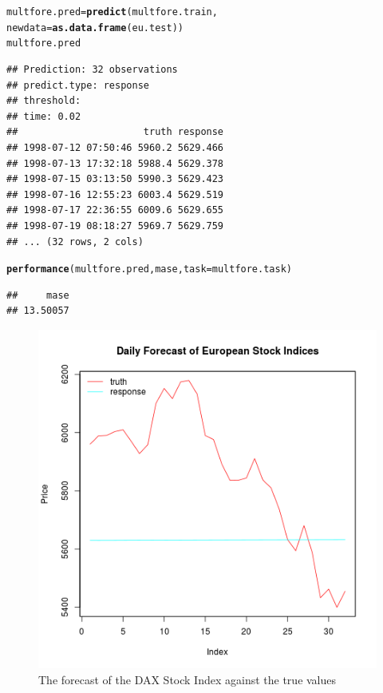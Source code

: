 \documentclass[12pt]{article}\usepackage[]{graphicx}\usepackage[]{color}
\makeatletter
\newcommand{\hlstd}[1]{\textcolor[rgb]{0.345,0.345,0.345}{#1}}%
\newcommand{\hlkwb}[1]{\textcolor[rgb]{0.69,0.353,0.396}{#1}}%
\newcommand{\hlkwc}[1]{\textcolor[rgb]{0.333,0.667,0.333}{#1}}%
\newcommand{\hlkwd}[1]{\textcolor[rgb]{0.737,0.353,0.396}{\textbf{#1}}}%
\newenvironment{kframe}{%
 \def\at@end@of@kframe{}%
 \ifinner\ifhmode%
  \def\at@end@of@kframe{\end{minipage}}%
  \begin{minipage}{\columnwidth}%
 \fi\fi%
 \def\FrameCommand##1{\hskip\@totalleftmargin \hskip-\fboxsep
 \colorbox{shadecolor}{##1}\hskip-\fboxsep
     \hskip-\linewidth \hskip-\@totalleftmargin \hskip\columnwidth}%
 \MakeFramed {\advance\hsize-\width
   \@totalleftmargin\z@ \linewidth\hsize
   \@setminipage}}%
 {\par\unskip\endMakeFramed%
 \at@end@of@kframe}
\newenvironment{knitrout}{}{} %
\theoremstyle{definition}
\makeatother
\begin{document}
\begin{knitrout}
\color{fgcolor}\begin{kframe}
\begin{alltt}
\hlstd{multfore.pred} \hlkwb{=} \hlkwd{predict}\hlstd{(multfore.train,}
                  \hlkwc{newdata} \hlstd{=} \hlkwd{as.data.frame}\hlstd{(eu.test))}
\hlstd{multfore.pred}
\end{alltt}
\begin{verbatim}
## Prediction: 32 observations
## predict.type: response
## threshold: 
## time: 0.02
##                      truth response
## 1998-07-12 07:50:46 5960.2 5629.466
## 1998-07-13 17:32:18 5988.4 5629.378
## 1998-07-15 03:13:50 5990.3 5629.423
## 1998-07-16 12:55:23 6003.4 5629.519
## 1998-07-17 22:36:55 6009.6 5629.655
## 1998-07-19 08:18:27 5969.7 5629.759
## ... (32 rows, 2 cols)
\end{verbatim}
\begin{alltt}
\hlkwd{performance}\hlstd{(multfore.pred, mase,} \hlkwc{task} \hlstd{= multfore.task)}
\end{alltt}
\begin{verbatim}
##     mase 
## 13.50057
\end{verbatim}
\end{kframe}
\end{knitrout}
\doublespacing



\begin{figure}[h!]
\includegraphics[width=\linewidth]{multfore_tune.png}
\centering
\caption{The forecast of the DAX Stock Index against the true values}
\label{fig:multfore_tune}
\end{figure}
\end{document}
